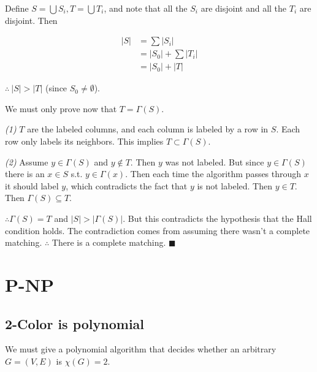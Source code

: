 \documentclass[a4paper, 12pt]{article}
\begin{document}
Define $S = \bigcup S_i, T = \bigcup T_i$, and note that all the $S_i$ are
disjoint and all the $T_i$ are disjoint. Then

\begin{align*}
    |S| &= \sum |S_i| \\ 
        &= |S_0| + \sum |T_i| \\ 
        &= |S_0| + |T|
\end{align*}

$\therefore ~ |S| > |T|$ (since $S_0 \neq \emptyset$).

We must only prove now that $T = \Gamma(S)$. 

\textit{(1)} $T$ are the labeled columns, and each column is labeled by a row in $S$.
Each row only labels its neighbors. This implies $T \subset \Gamma(S)$.

\textit{(2)} Assume $y \in \Gamma(S)$ and $y \not\in T$. Then $y$ was 
not labeled. But since $y \in \Gamma(S)$ there is an 
$x \in S$ s.t. $y \in \Gamma(x)$. Then each time 
the algorithm passes through $x$ it should label 
$y$, which contradicts the fact that $y$ is not 
labeled. Then $y \in T$. Then $\Gamma(S) \subseteq T$.

$\therefore \Gamma(S) = T$ and $|S| > |\Gamma(S)|$. But this contradicts 
the hypothesis that the Hall condition holds. The 
contradiction comes from assuming there wasn't a 
complete matching. $\therefore $ There is a complete
matching. $\blacksquare$

\pagebreak
\section{P-NP}

\subsection{2-Color is polynomial}

We must give a polynomial algorithm that decides whether an arbitrary $G = (V,
E)$ is $\chi(G) = 2$. 
\end{document}
